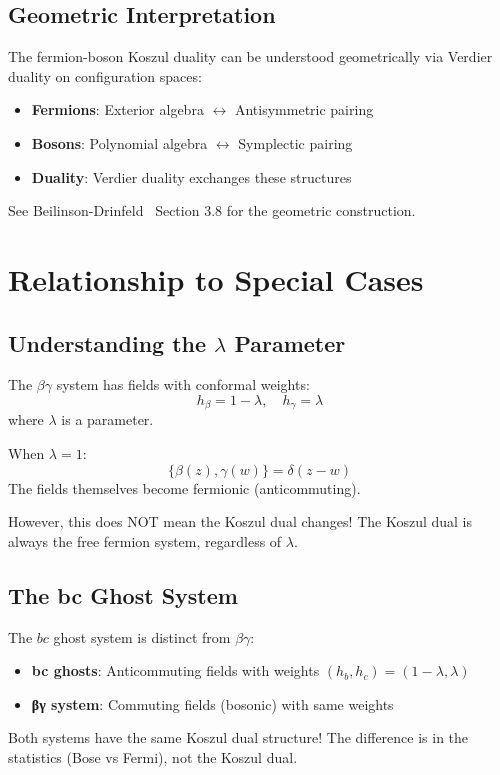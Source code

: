 \subsection{Geometric Interpretation}

\begin{remark}
The fermion-boson Koszul duality can be understood geometrically via Verdier duality on configuration spaces:

\begin{itemize}
\item \textbf{Fermions}: Exterior algebra $\leftrightarrow$ Antisymmetric pairing
\item \textbf{Bosons}: Polynomial algebra $\leftrightarrow$ Symplectic pairing
\item \textbf{Duality}: Verdier duality exchanges these structures
\end{itemize}

See Beilinson-Drinfeld~\cite{BeilinsonDrinfeld} Section 3.8 for the geometric construction.
\end{remark}

\section{Relationship to Special Cases}

\subsection{Understanding the $\lambda$ Parameter}

\begin{remark}
The $\beta\gamma$ system has fields with conformal weights:
$$h_\beta = 1-\lambda, \quad h_\gamma = \lambda$$
where $\lambda$ is a parameter.

When $\lambda = 1$:
$$\{\beta(z), \gamma(w)\} = \delta(z-w)$$
The fields themselves become fermionic (anticommuting).

However, this does NOT mean the Koszul dual changes! The Koszul dual is always the free fermion system, 
regardless of $\lambda$.
\end{remark}

\subsection{The bc Ghost System}

\begin{remark}[bc vs βγ]
The $bc$ ghost system is distinct from $\beta\gamma$:
\begin{itemize}
\item \textbf{bc ghosts}: Anticommuting fields with weights $(h_b, h_c) = (1-\lambda, \lambda)$
\item \textbf{βγ system}: Commuting fields (bosonic) with same weights
\end{itemize}

Both systems have the same Koszul dual structure! The difference is in the statistics (Bose vs Fermi), 
not the Koszul dual.
\end{remark}

